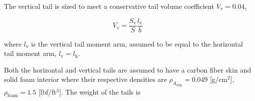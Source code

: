 % 
% 
% 
% 
% 
% 

The vertical tail is sized to meet a conservative tail volume coefficient $V_{\text{v}}= 0.04$,\cite{aircraftrules}

\begin{equation}
    \label{e:vtv}
    V_{\text{v}} = \frac{S_{\text{v}}}{S} \frac{l_{\text{v}}}{b}
\end{equation}

where $l_{\text{v}}$ is the vertical tail moment arm, assumed to be equal to the horizontal tail moment arm, $l_{\text{v}} = l_{\text{h}}$.

Both the horizontal and vertical tails are assumed to have a carbon fiber skin and solid foam interior where their respective densities are $\rho_{A_{\text{cfrp}}} = 0.049$ [g/cm$^2$], $\rho_{\text{foam}} = 1.5$ [lbf/ft$^3$]. 
The weight of the tails is

